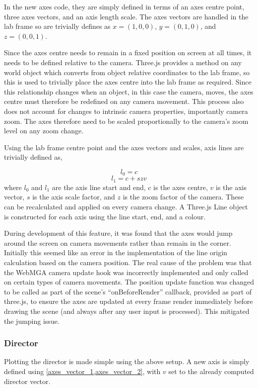 In the new axes code, they are simply defined in terms of an axes centre point, three axes vectors, and an axis length scale. The axes vectors are handled in the lab frame so are trivially defines as $x=(1,0,0)$, $y=(0,1,0)$, and $z=(0,0,1)$.

Since the axes centre needs to remain in a fixed position on screen at all times, it needs to be defined relative to the camera. Three.js provides a method on any world object which converts from object relative coordinates to the lab frame, so this is used to trivially place the axes centre into the lab frame as required. Since this relationship changes when an object, in this case the camera, moves, the axes centre must therefore be redefined on any camera movement. This process also does not account for changes to intrinsic camera properties, importantly camera zoom. The axes therefore need to be scaled proportionally to the camera's zoom level on any zoom change.

Using the lab frame centre point and the axes vectors and scales, axis lines are trivially defined as,

\begin{equation}
  l_0=c\label{axes_vector_1}
\end{equation}
\begin{equation}
  l_1=c+szv\label{axes_vector_2}
\end{equation}
where $l_0$ and $l_1$ are the axis line start and end, $c$ is the axes centre, $v$ is the axis vector, $s$ is the axis scale factor, and $z$ is the zoom factor of the camera. These can be recalculated and applied on every camera change. A Three.js Line object is constructed for each axis using the line start, end, and a colour.

During development of this feature, it was found that the axes would jump around the screen on camera movements rather than remain in the corner. Initially this seemed like an error in the implementation of the line origin calculation based on the camera position. The real cause of the problem was that the WebMGA camera update hook was incorrectly implemented and only called on certain types of camera movements. The position update function was changed to be called as part of the scene's ``onBeforeRender'' callback, provided as part of three.js, to ensure the axes are updated at every frame render immediately before drawing the scene (and always after any user input is processed). This mitigated the jumping issue.

\subsubsection{Director}
\label{director_axis_plot}
Plotting the director is made simple using the above setup. A new axis is simply defined using \cref{axes_vector_1,axes_vector_2}, with $v$ set to the already computed director vector.

